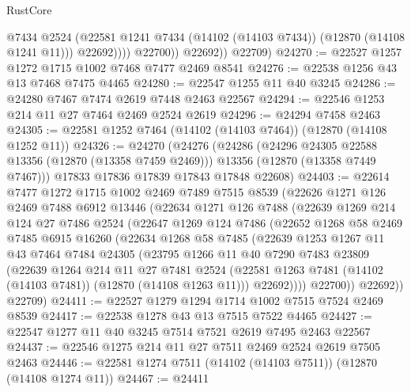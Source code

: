 \begin{lexlean}{RustCore}
\begin{coremodule}
                      @7434
                      @2524
                      (@22581 @1241 @7434 (@14102 (@14103 @7434)) (@12870 (@14108 @1241 @11)))
                      @22692))))
              @22700))
          @22692))
      @22709)
@24270 := @22527 @1257 @1272 @1715 @1002 @7468 @7477 @2469 @8541
@24276 := @22538 @1256 @43 @13 @7468 @7475 @4465
@24280 := @22547 @1255 @11 @40 @3245
@24286 := @24280 @7467 @7474 @2619 @7448 @2463 @22567
@24294 := @22546 @1253 @214 @11 @27 @7464 @2469 @2524 @2619
@24296 := @24294 @7458 @2463
@24305 := @22581 @1252 @7464 (@14102 (@14103 @7464)) (@12870 (@14108 @1252 @11))
@24326 := @24270
    (@24276
      (@24286
        (@24296 @24305 @22588 @13356 (@12870 (@13358 @7459 @2469)))
        @13356
        (@12870 (@13358 @7449 @7467)))
      @17833
      @17836
      @17839
      @17843
      @17848
      @22608)
@24403 := @22614
    @7477
    @1272
    @1715
    @1002
    @2469
    @7489
    @7515
    @8539
    (@22626
      @1271
      @126
      @2469
      @7488
      @6912
      @13446
      (@22634
        @1271
        @126
        @7488
        (@22639
          @1269
          @214
          @124
          @27
          @7486
          @2524
          (@22647
            @1269
            @124
            @7486
            (@22652
              @1268
              @58
              @2469
              @7485
              @6915
              @16260
              (@22634
                @1268
                @58
                @7485
                (@22639
                  @1253
                  @1267
                  @11
                  @43
                  @7464
                  @7484
                  @24305
                  (@23795
                    @1266
                    @11
                    @40
                    @7290
                    @7483
                    @23809
                    (@22639
                      @1264
                      @214
                      @11
                      @27
                      @7481
                      @2524
                      (@22581 @1263 @7481 (@14102 (@14103 @7481)) (@12870 (@14108 @1263 @11)))
                      @22692))))
              @22700))
          @22692))
      @22709)
@24411 := @22527 @1279 @1294 @1714 @1002 @7515 @7524 @2469 @8539
@24417 := @22538 @1278 @43 @13 @7515 @7522 @4465
@24427 := @22547 @1277 @11 @40 @3245 @7514 @7521 @2619 @7495 @2463 @22567
@24437 := @22546 @1275 @214 @11 @27 @7511 @2469 @2524 @2619 @7505 @2463
@24446 := @22581 @1274 @7511 (@14102 (@14103 @7511)) (@12870 (@14108 @1274 @11))
@24467 := @24411

\end{coremodule}
\end{lexlean}
